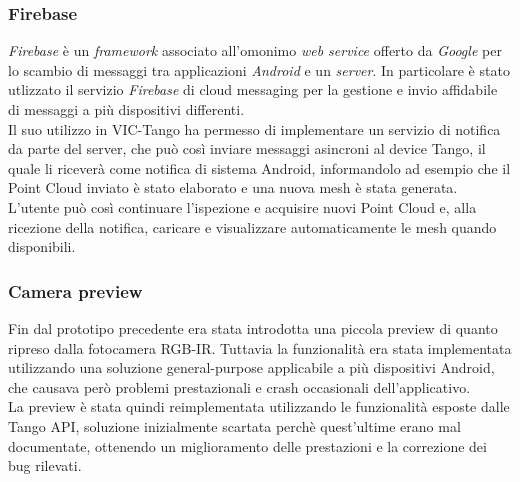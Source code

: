 \subsubsection{Firebase}
\emph{Firebase} è un \emph{framework} associato all'omonimo \emph{web service} offerto da \emph{Google} per lo scambio di messaggi tra applicazioni \emph{Android} e un \emph{server}. In particolare è stato utlizzato il servizio \emph{Firebase} di cloud messaging per la gestione e invio affidabile di messaggi a più dispositivi differenti.\\ Il suo utilizzo in VIC-Tango ha permesso di implementare un servizio di notifica da parte del server, che può così inviare messaggi asincroni al device Tango, il quale li riceverà come notifica di sistema Android, informandolo ad esempio che il Point Cloud inviato è stato elaborato e una nuova mesh è stata generata. L'utente può così continuare l'ispezione e acquisire nuovi Point Cloud e, alla ricezione della notifica, caricare e visualizzare automaticamente le mesh quando disponibili.

\subsubsection{Camera preview}
Fin dal prototipo precedente era stata introdotta una piccola preview di quanto ripreso dalla fotocamera RGB-IR. Tuttavia la funzionalità era stata implementata utilizzando una soluzione general-purpose applicabile a più dispositivi Android, che causava però problemi prestazionali e crash occasionali dell'applicativo. \\
La preview è stata quindi reimplementata utilizzando le funzionalità esposte dalle Tango API, soluzione inizialmente scartata perchè quest'ultime erano mal documentate, ottenendo un miglioramento delle prestazioni e la correzione dei bug rilevati.

